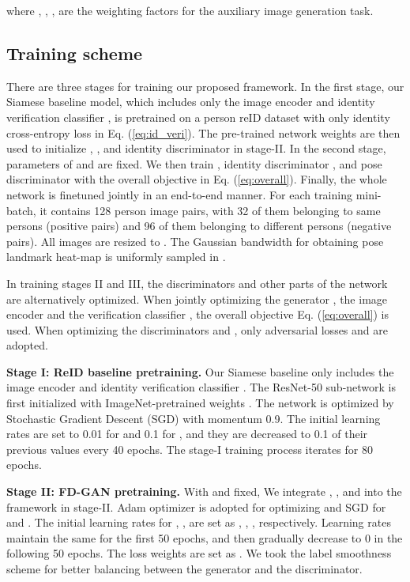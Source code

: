 \documentclass{article}
\begin{document}
where , , ,  are the weighting factors for the auxiliary image generation task.

\subsection{Training scheme}
There are three stages for training our proposed framework.
In the first stage, our Siamese baseline model, which includes only the image encoder  and identity verification classifier , is pretrained on a person reID dataset with only identity cross-entropy loss  in Eq. (\ref{eq:id_veri}). The pre-trained network weights are then used to initialize , , and identity discriminator  in stage-II. In the second stage, parameters of  and  are fixed. We then train , identity discriminator , and pose discriminator  with the overall objective  in Eq. (\ref{eq:overall}). Finally, the whole network is finetuned jointly in an end-to-end manner. For each training mini-batch, it contains 128 person image pairs, with 32 of them belonging to same persons (positive pairs) and 96 of them belonging to different persons (negative pairs). All images are resized to . The Gaussian bandwidth for obtaining pose landmark heat-map is uniformly sampled in .

In training stages II and III, the discriminators and other parts of the network are alternatively optimized. When jointly optimizing the generator , the image encoder  and the verification classifier , the overall objective Eq. (\ref{eq:overall}) is used. When optimizing the discriminators  and , only adversarial losses  and  are adopted.

\textbf{Stage I: ReID baseline pretraining.}
Our Siamese baseline only includes the image encoder  and identity verification classifier . The ResNet-50 sub-network is first initialized with ImageNet-pretrained weights \cite{deng2009imagenet}.
The network is optimized by Stochastic Gradient Descent (SGD) with momentum 0.9.
The initial learning rates are set to 0.01 for  and 0.1 for , and they are decreased to 0.1 of their previous values every 40 epochs.
The stage-I training process iterates for 80 epochs.

\textbf{Stage II: FD-GAN pretraining.}
With  and  fixed, We integrate , , and  into the framework in stage-II. Adam optimizer is adopted for optimizing  and SGD for  and .
The initial learning rates for , ,  are set as , , , respectively.
Learning rates maintain the same for the first 50 epochs, and then gradually decrease to 0 in the following 50 epochs.
The loss weights are set as .
We took the label smoothness scheme \citep{salimans2016improved} for better balancing between the generator and the discriminator.
\end{document}
